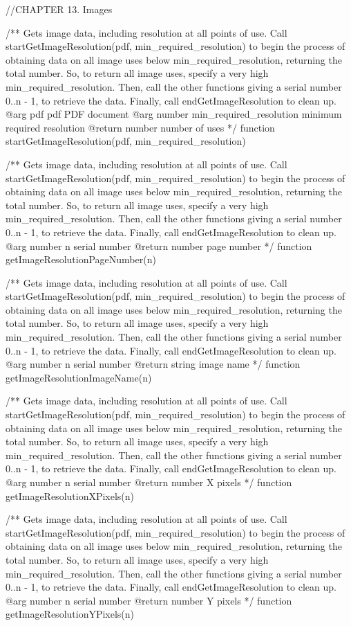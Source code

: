 //CHAPTER 13. Images

/** Gets image data, including resolution at all points of use. Call
startGetImageResolution(pdf, min_required_resolution) to begin the process of
obtaining data on all image uses below min_required_resolution, returning the
total number. So, to return all image uses, specify a very high
min_required_resolution. Then, call the other functions giving a serial number
0..n - 1, to retrieve the data. Finally, call endGetImageResolution to clean
up.
@arg {pdf} pdf PDF document
@arg {number} min_required_resolution minimum required resolution
@return {number} number of uses */
function startGetImageResolution(pdf, min_required_resolution) {}

/** Gets image data, including resolution at all points of use. Call
startGetImageResolution(pdf, min_required_resolution) to begin the process of
obtaining data on all image uses below min_required_resolution, returning the
total number. So, to return all image uses, specify a very high
min_required_resolution. Then, call the other functions giving a serial number
0..n - 1, to retrieve the data. Finally, call endGetImageResolution to clean
up.
@arg {number} n serial number
@return {number} page number */
function getImageResolutionPageNumber(n) {}

/** Gets image data, including resolution at all points of use. Call
startGetImageResolution(pdf, min_required_resolution) to begin the process of
obtaining data on all image uses below min_required_resolution, returning the
total number. So, to return all image uses, specify a very high
min_required_resolution. Then, call the other functions giving a serial number
0..n - 1, to retrieve the data. Finally, call endGetImageResolution to clean
up.
@arg {number} n serial number
@return {string} image name */
function getImageResolutionImageName(n) {}

/** Gets image data, including resolution at all points of use. Call
startGetImageResolution(pdf, min_required_resolution) to begin the process of
obtaining data on all image uses below min_required_resolution, returning the
total number. So, to return all image uses, specify a very high
min_required_resolution. Then, call the other functions giving a serial number
0..n - 1, to retrieve the data. Finally, call endGetImageResolution to clean
up.
@arg {number} n serial number
@return {number} X pixels */
function getImageResolutionXPixels(n) {}

/** Gets image data, including resolution at all points of use. Call
startGetImageResolution(pdf, min_required_resolution) to begin the process of
obtaining data on all image uses below min_required_resolution, returning the
total number. So, to return all image uses, specify a very high
min_required_resolution. Then, call the other functions giving a serial number
0..n - 1, to retrieve the data. Finally, call endGetImageResolution to clean
up.
@arg {number} n serial number
@return {number} Y pixels */
function getImageResolutionYPixels(n) {}

